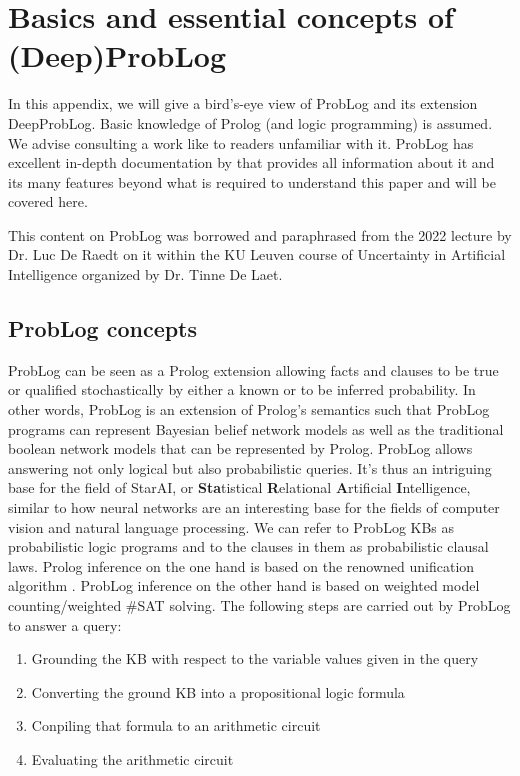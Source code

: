 \chapter{Basics and essential concepts of (Deep)ProbLog} \label{problog_deepproblog_essentials}
In this appendix, we will give a bird's-eye view of ProbLog and its extension DeepProbLog. Basic knowledge of Prolog (and logic programming) is assumed. We advise consulting a work like \cite{learnprolognow} to readers unfamiliar with it. ProbLog has excellent in-depth documentation by \cite{problog_documentation} that provides all information about it and its many features beyond what is required to understand this paper and will be covered here.

This content on ProbLog was borrowed and paraphrased from the 2022 lecture by Dr. Luc De Raedt on it within the KU Leuven course of Uncertainty in Artificial Intelligence organized by Dr. Tinne De Laet.

\section{ProbLog concepts}
ProbLog can be seen as a Prolog extension allowing facts and clauses to be true or qualified stochastically by either a known or to be inferred probability. In other words, ProbLog is an extension of Prolog's semantics such that ProbLog programs can represent Bayesian belief network models as well as the traditional boolean network models that can be represented by Prolog. ProbLog allows answering not only logical but also probabilistic queries. It's thus an intriguing base for the field of StarAI, or \textbf{Sta}tistical \textbf{R}elational \textbf{A}rtificial \textbf{I}ntelligence, similar to how neural networks are an interesting base for the fields of computer vision and natural language processing. We can refer to ProbLog KBs as probabilistic logic programs and to the clauses in them as probabilistic clausal laws.
Prolog inference on the one hand is based on the renowned unification algorithm \cite{how_prolog_works}. ProbLog inference on the other hand is based on weighted model counting/weighted \#SAT solving. The following steps are carried out by ProbLog to answer a query:
\begin{enumerate}
  \item Grounding the KB with respect to the variable values given in the query
  \item Converting the ground KB into a propositional logic formula
  \item Conpiling that formula to an arithmetic circuit
  \item Evaluating the arithmetic circuit
\end{enumerate}


